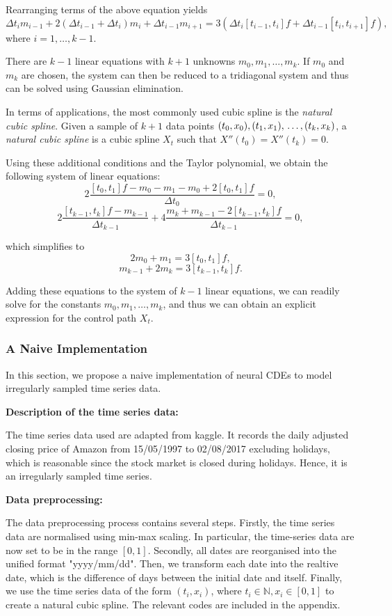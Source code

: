 \documentclass[a4paper,11pt,titlepage]{article}
\theoremstyle{definition}
\theoremstyle{plain}
\theoremstyle{remark}
\begin{document}
Rearranging terms of the above equation yields
$$\Delta t_im_{i-1}+2(\Delta t_{i-1}+\Delta t_i)m_i+\Delta t_{i-1}m_{i+1}=3(\Delta t_i[t_{i-1},t_i]f+\Delta t_{i-1}[t_i,t_{i+1}]f),$$
where $i=1,\dots,k-1$.

There are $k-1$ linear equations with $k+1$ unknowns $m_0,m_1,\dots,m_k$. If $m_0$ and $m_k$ are chosen, the system can then be reduced to a tridiagonal system and thus can be solved using Gaussian elimination.

In terms of applications, the most commonly used cubic spline is the \textit{natural cubic spline}.
 Given a sample of $k+1$ data points
$(t_0,x_0), (t_1,x_1), \\\dots, (t_k,x_k)$, a \textit{natural cubic spline} is a cubic spline $X_t$ such that $X''(t_0)=X''(t_k)=0$.

Using these additional conditions and the Taylor polynomial, we obtain the following system of linear equations:
$$2\frac{[t_0,t_1]f-m_0-m_1-m_0+2[t_0,t_1]f}{\Delta t_0}=0,$$
$$2\frac{[t_{k-1},t_k]f-m_{k-1}}{\Delta t_{k-1}}+4\frac{m_k+m_{k-1}-2[t_{k-1},t_k]f}{\Delta t_{k-1}}=0,$$

which simplifies to
$$2m_0+m_1=3[t_0,t_1]f,$$
$$m_{k-1}+2m_k=3[t_{k-1},t_k]f.$$

Adding these equations to the system of $k-1$ linear equations, we can readily solve for the constants $m_0,m_1,\dots,m_k$, and thus we can obtain an explicit expression for the control path $X_t$.

\subsubsection{A Naive Implementation}

In this section, we propose a naive implementation of neural CDEs to model irregularly sampled time series data.

\textbf{Description of the time series data:}

The time series data used are adapted from kaggle. It records the daily adjusted closing price of Amazon from 15/05/1997 to 02/08/2017 excluding holidays, which is reasonable since the stock market is closed during holidays. Hence, it is an irregularly sampled time series.

\textbf{Data preprocessing:}

The data preprocessing process contains several steps. Firstly, the time series data are normalised using min-max scaling. In particular, the time-series data are now set to be in the range $[0,1]$. Secondly, all dates are reorganised into the unified format "yyyy/mm/dd". Then, we transform each date into the realtive date, which is the difference of days between the initial date and itself. Finally, we use the time series data of the form $(t_i,x_i)$, where $t_i\in\mathbb{N}, x_i\in[0,1]$ to create a natural cubic spline. The relevant codes are included in the appendix.
\end{document}
